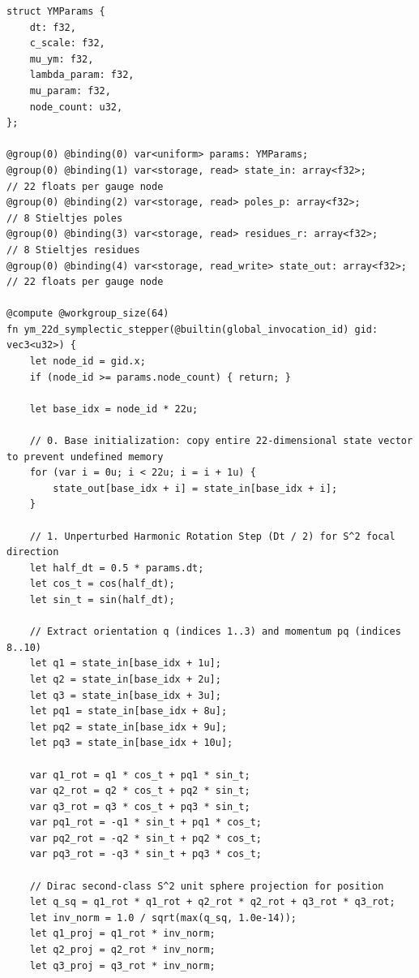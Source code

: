\documentclass[11pt,a4paper,reqno]{article}
\theoremstyle{plain}
\theoremstyle{definition}
\theoremstyle{remark}
\numberwithin{equation}{section}
\newcommand{\Eym}{\mathcal{E}_{\mathrm{YM}}^{22}}
\begin{document}
\begin{lstlisting}[style=puristkernel, caption={Production WebGPU WGSL Fast-Gauge Transverse Leaf Compute Kernel (Sub-Step $\mathcal{X}_{\Delta s}$) on $\Eym$. Instanton core scale $u$ acts as an adiabatic invariant during fast radiative Fenichel contraction, while slow radial breathing is executed in companion operator $\mathcal{Y}_{\Delta s}$.}, label={lst:wgsl_ym}]
struct YMParams {
    dt: f32,
    c_scale: f32,
    mu_ym: f32,
    lambda_param: f32,
    mu_param: f32,
    node_count: u32,
};

@group(0) @binding(0) var<uniform> params: YMParams;
@group(0) @binding(1) var<storage, read> state_in: array<f32>;        // 22 floats per gauge node
@group(0) @binding(2) var<storage, read> poles_p: array<f32>;         // 8 Stieltjes poles
@group(0) @binding(3) var<storage, read> residues_r: array<f32>;      // 8 Stieltjes residues
@group(0) @binding(4) var<storage, read_write> state_out: array<f32>; // 22 floats per gauge node

@compute @workgroup_size(64)
fn ym_22d_symplectic_stepper(@builtin(global_invocation_id) gid: vec3<u32>) {
    let node_id = gid.x;
    if (node_id >= params.node_count) { return; }

    let base_idx = node_id * 22u;

    // 0. Base initialization: copy entire 22-dimensional state vector to prevent undefined memory
    for (var i = 0u; i < 22u; i = i + 1u) {
        state_out[base_idx + i] = state_in[base_idx + i];
    }

    // 1. Unperturbed Harmonic Rotation Step (Dt / 2) for S^2 focal direction
    let half_dt = 0.5 * params.dt;
    let cos_t = cos(half_dt);
    let sin_t = sin(half_dt);

    // Extract orientation q (indices 1..3) and momentum pq (indices 8..10)
    let q1 = state_in[base_idx + 1u];
    let q2 = state_in[base_idx + 2u];
    let q3 = state_in[base_idx + 3u];
    let pq1 = state_in[base_idx + 8u];
    let pq2 = state_in[base_idx + 9u];
    let pq3 = state_in[base_idx + 10u];

    var q1_rot = q1 * cos_t + pq1 * sin_t;
    var q2_rot = q2 * cos_t + pq2 * sin_t;
    var q3_rot = q3 * cos_t + pq3 * sin_t;
    var pq1_rot = -q1 * sin_t + pq1 * cos_t;
    var pq2_rot = -q2 * sin_t + pq2 * cos_t;
    var pq3_rot = -q3 * sin_t + pq3 * cos_t;

    // Dirac second-class S^2 unit sphere projection for position
    let q_sq = q1_rot * q1_rot + q2_rot * q2_rot + q3_rot * q3_rot;
    let inv_norm = 1.0 / sqrt(max(q_sq, 1.0e-14));
    let q1_proj = q1_rot * inv_norm;
    let q2_proj = q2_rot * inv_norm;
    let q3_proj = q3_rot * inv_norm;


\end{lstlisting}
\end{document}
